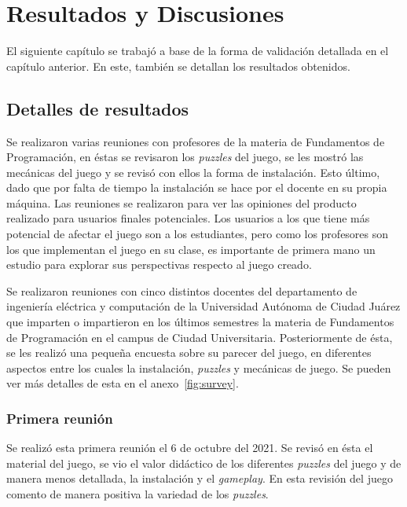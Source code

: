 \chapter{Resultados y Discusiones}
El siguiente capítulo se trabajó a base de la forma de validación detallada en el capítulo anterior. En este, también se detallan los resultados obtenidos.

\section{Detalles de resultados}
Se realizaron varias reuniones con profesores de la materia de Fundamentos de Programación, en éstas se revisaron los \textit{puzzles} del juego, se les mostró las mecánicas del juego y se revisó con ellos la forma de instalación. Esto último, dado que por falta de tiempo la instalación se hace por el docente en su propia máquina. Las reuniones se realizaron para ver las opiniones del producto realizado para usuarios finales potenciales. Los usuarios a los que tiene más potencial de afectar el juego son a los estudiantes, pero como los profesores son los que implementan el juego en su clase, es importante de primera mano un estudio para explorar sus perspectivas respecto al juego creado.

Se realizaron reuniones con cinco distintos docentes del departamento de ingeniería eléctrica y computación de la Universidad Autónoma de Ciudad Juárez que imparten o impartieron en los últimos semestres la materia de Fundamentos de Programación en el campus de Ciudad Universitaria. Posteriormente de ésta, se les realizó una pequeña encuesta sobre su parecer del juego, en diferentes aspectos entre los cuales la instalación, \textit{puzzles} y mecánicas de juego.  Se pueden ver más detalles de esta en el anexo~\ref{fig:survey}.

\subsection{Primera reunión}
Se realizó esta primera reunión el 6 de octubre del 2021. Se revisó en ésta el material del juego, se vio el valor didáctico de los diferentes \textit{puzzles} del juego y de manera menos detallada, la instalación y el \textit{gameplay}. En esta revisión del juego comento de manera positiva la variedad de los \textit{puzzles}. 

